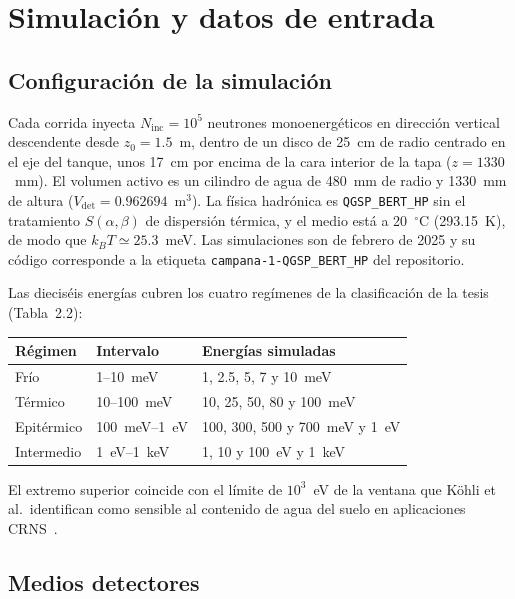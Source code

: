 \documentclass[11pt,a4paper]{article}
\newcommand{\codigo}[1]{\nolinkurl{#1}}
\begin{document}
\section{Simulación y datos de entrada}
\label{sec:datos}

\subsection{Configuración de la simulación}

Cada corrida inyecta $N_\mathrm{inc}=10^5$ neutrones monoenergéticos en dirección vertical descendente desde $z_0=1.5$~m, dentro de un disco de 25~cm de radio centrado en el eje del tanque, unos 17~cm por encima de la cara interior de la tapa ($z=1330$~mm). El volumen activo es un cilindro de agua de 480~mm de radio y 1330~mm de altura ($V_\mathrm{det}=0.962694$~m$^3$). La física hadrónica es \texttt{QGSP\_BERT\_HP} sin el tratamiento $S(\alpha,\beta)$ de dispersión térmica, y el medio está a 20~$^\circ$C (293.15~K), de modo que $k_BT\simeq25.3$~meV. Las simulaciones son de febrero de 2025 y su código corresponde a la etiqueta \codigo{campana-1-QGSP_BERT_HP} del repositorio.

Las dieciséis energías cubren los cuatro regímenes de la clasificación de la tesis (Tabla~2.2):

\begin{center}
\small
\begin{tabular}{@{}lll@{}}
\toprule
\textbf{Régimen} & \textbf{Intervalo} & \textbf{Energías simuladas} \\
\midrule
Frío & 1--10~meV & 1, 2.5, 5, 7 y 10~meV \\
Térmico & 10--100~meV & 10, 25, 50, 80 y 100~meV \\
Epitérmico & 100~meV--1~eV & 100, 300, 500 y 700~meV y 1~eV \\
Intermedio & 1~eV--1~keV & 1, 10 y 100~eV y 1~keV \\
\bottomrule
\end{tabular}
\end{center}

El extremo superior coincide con el límite de $10^3$~eV de la ventana que Köhli et al.\ identifican como sensible al contenido de agua del suelo en aplicaciones CRNS~\cite{Kohli2015}.

\subsection{Medios detectores}
\end{document}
